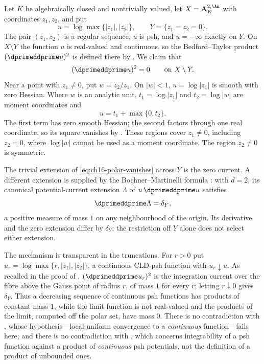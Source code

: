 \begin{example}
\label{ex:ch16-polar-failure}
Let $K$ be algebraically closed and nontrivially valued, let
$X=\mathbf A^{2,\An}_K$ with coordinates $z_1,z_2$, and put
\[
 u=\log\max\{|z_1|,|z_2|\},
 \qquad
 Y=\{z_1=z_2=0\} .
\]
The pair $(z_1,z_2)$ is a regular sequence, $u$ is psh, and
$u=-\infty$ exactly on $Y$.  On $X\setminus Y$ the function $u$ is
real-valued and continuous, so the Bedford--Taylor product
$(\dprimeddprime u)^2$ is defined there by
.  We claim that
\begin{equation}
\label{eq:ch16-polar-vanishes}
 (\dprimeddprime u)^2=0\qquad\text{on }X\setminus Y .
\end{equation}
Near a point with $z_1\neq0$, put $w=z_2/z_1$.  On $|w|<1$,
$u=\log|z_1|$ is smooth with zero Hessian.  Where $w$ is an analytic unit,
$t_1=\log|z_1|$ and $t_2=\log|w|$ are moment coordinates and
\[
 u=t_1+\max\{0,t_2\}.
\]
The first term has zero smooth Hessian; the second factors through one
real coordinate, so its square vanishes by
.  These regions cover $z_1\neq0$,
including $z_2=0$, where $\log|w|$ cannot be used as a moment coordinate.
The region $z_2\neq0$ is symmetric.

The trivial extension of \eqref{eq:ch16-polar-vanishes} across $Y$ is the
zero current.  A different extension is supplied by the
Bochner--Martinelli formula :
with $d=2$, its canonical potential-current extension $\Lambda$ of
$u\,\dprimeddprime u$
satisfies
\[
 \dprimeddprime\Lambda=\delta_Y ,
\]
a positive measure of mass $1$ on any neighbourhood of the origin.  Its derivative and the zero extension differ by $\delta_Y$; the
restriction off $Y$ alone does not select either extension.

The mechanism is transparent in the truncations.  For $r>0$ put
$u_r=\log\max\{r,|z_1|,|z_2|\}$, a continuous CLD-psh function with
$u_r\downarrow u$.  As recalled in the proof of
, $(\dprimeddprime u_r)^2$ is the
integration current over the fibre above the Gauss point of radius $r$, of
mass $1$ for every $r$; letting $r\downarrow0$ gives $\delta_Y$.  Thus a
decreasing sequence of continuous psh functions has products of constant
mass $1$, while the limit function is not real-valued and the products of
the limit, computed off the polar set, have mass $0$.  There is no
contradiction with , whose hypothesis---local
uniform convergence to a \emph{continuous} function---fails here; and there
is no contradiction with , which concerns
integrability of a psh function against a product of \emph{continuous} psh
potentials, not the definition of a product of unbounded ones.


\end{example}
